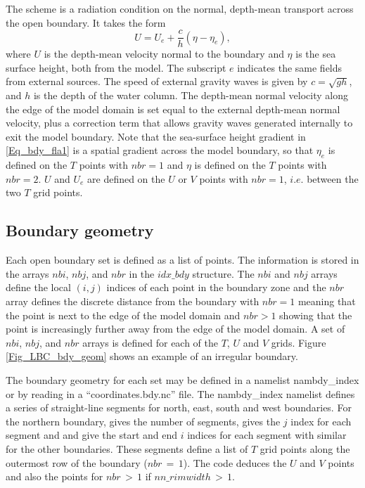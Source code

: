 The \citet{Flather_JPO94} scheme is a radiation condition on the normal, depth-mean
transport across the open boundary. It takes the form
\begin{equation}  \label{Eq_bdy_fla1}
U = U_{e} + \frac{c}{h}\left(\eta - \eta_{e}\right),
\end{equation}
where $U$ is the depth-mean velocity normal to the boundary and $\eta$
is the sea surface height, both from the model. The subscript $e$
indicates the same fields from external sources. The speed of external
gravity waves is given by $c = \sqrt{gh}$, and $h$ is the depth of the
water column. The depth-mean normal velocity along the edge of the
model domain is set equal to the
external depth-mean normal velocity, plus a correction term that
allows gravity waves generated internally to exit the model boundary.
Note that the sea-surface height gradient in \eqref{Eq_bdy_fla1}
is a spatial gradient across the model boundary, so that $\eta_{e}$ is
defined on the $T$ points with $nbr=1$ and $\eta$ is defined on the
$T$ points with $nbr=2$. $U$ and $U_{e}$ are defined on the $U$ or
$V$ points with $nbr=1$, $i.e.$ between the two $T$ grid points.

\subsection{Boundary geometry}
\label{BDY_geometry}

Each open boundary set is defined as a list of points. The information
is stored in the arrays $nbi$, $nbj$, and $nbr$ in the $idx\_bdy$
structure.  The $nbi$ and $nbj$ arrays
define the local $(i,j)$ indices of each point in the boundary zone
and the $nbr$ array defines the discrete distance from the boundary
with $nbr=1$ meaning that the point is next to the edge of the
model domain and $nbr>1$ showing that the point is increasingly
further away from the edge of the model domain. A set of $nbi$, $nbj$,
and $nbr$ arrays is defined for each of the $T$, $U$ and $V$
grids. Figure \ref{Fig_LBC_bdy_geom} shows an example of an irregular
boundary. 

The boundary geometry for each set may be defined in a namelist
nambdy\_index or by reading in a ``coordinates.bdy.nc'' file. The
nambdy\_index namelist defines a series of straight-line segments for
north, east, south and west boundaries. For the northern boundary,
 gives the number of segments,  gives the $j$
index for each segment and  and  give the start
and end $i$ indices for each segment with similar for the other
boundaries. These segments define a list of $T$ grid points along the
outermost row of the boundary ($nbr\,=\, 1$). The code deduces the $U$ and
$V$ points and also the points for $nbr\,>\, 1$ if
$nn\_rimwidth\,>\,1$.

